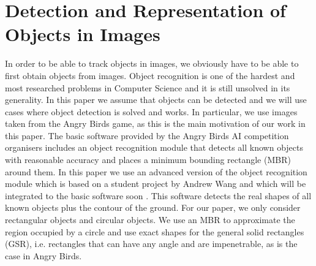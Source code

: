 \documentclass[letterpaper]{article}
\begin{document}
\vspace{-5mm}
\section{Detection and Representation of Objects in Images}
\vspace{-5mm}
In order to be able to track objects in images, we obviously have to be able to first obtain objects from images. Object recognition \cite{belongie2002shape,lowe1999object} is one of the hardest and most researched problems in Computer Science and it is still unsolved in its generality. In this paper we assume that objects can be detected and we will use cases where object detection is solved and works. In particular, we use images taken from the Angry Birds game, as this is the main motivation of our work in this paper. 
The basic software provided by the Angry Birds AI competition organisers includes an object recognition module that detects all known objects with reasonable accuracy and places a minimum bounding rectangle (MBR) around them. In this paper we use an advanced version of the object recognition module which is based on a student project by Andrew Wang and which will be integrated to the basic software soon \cite{andrewwang}. This software detects the real shapes of all known objects plus the contour of the ground. For our paper, we only consider rectangular objects and circular objects. We use an MBR to approximate the region occupied by a circle and use exact shapes for the general solid rectangles (GSR), i.e. rectangles that can have any angle and are impenetrable, as is the case in Angry Birds. 
\end{document}
